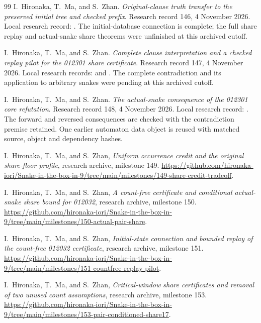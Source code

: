 \documentclass[11pt,a4paper]{article}
\theoremstyle{definition}
\theoremstyle{remark}
\begin{document}
\begin{thebibliography}{99}
I.~Hironaka, T.~Ma, and S.~Zhan. \emph{Original-clause truth transfer to the
preserved initial tree and checked prefix}. Research record 146,
4 November 2026. Local research record:
.
The initial-database connection is complete; the full share replay and
actual-snake share theorems were unfinished at this archived cutoff.

I.~Hironaka, T.~Ma, and S.~Zhan. \emph{Complete clause interpretation and a
checked replay pilot for the 012301 share certificate}. Research record 147,
4 November 2026. Local research records:
and .
The complete contradiction and its application to arbitrary snakes were pending at this archived cutoff.

I.~Hironaka, T.~Ma, and S.~Zhan. \emph{The actual-snake consequence of the
012301 core refutation}. Research record 148, 4 November 2026.
Local research record:
.
The forward and reversed consequences are checked with the contradiction
premise retained. One earlier automaton data object is reused with matched
source, object and dependency hashes.

I.~Hironaka, T.~Ma, and S.~Zhan, \emph{Uniform occurrence credit and the
original share-floor profile}, research archive, milestone 149.
\url{https://github.com/hironaka-iori/Snake-in-the-box-in-9/tree/main/milestones/149-share-credit-tradeoff}.

I.~Hironaka, T.~Ma, and S.~Zhan, \emph{A count-free certificate and
conditional actual-snake share bound for 012032}, research archive,
milestone 150.
\url{https://github.com/hironaka-iori/Snake-in-the-box-in-9/tree/main/milestones/150-actual-pair-share}.

I.~Hironaka, T.~Ma, and S.~Zhan, \emph{Initial-state connection and bounded
replay of the count-free 012032 certificate}, research archive, milestone 151.
\url{https://github.com/hironaka-iori/Snake-in-the-box-in-9/tree/main/milestones/151-countfree-replay-pilot}.

I.~Hironaka, T.~Ma, and S.~Zhan, \emph{Critical-window share certificates
and removal of two unused count assumptions}, research archive, milestone 153.
\url{https://github.com/hironaka-iori/Snake-in-the-box-in-9/tree/main/milestones/153-pair-conditioned-share17}.


\end{thebibliography}
\end{document}
